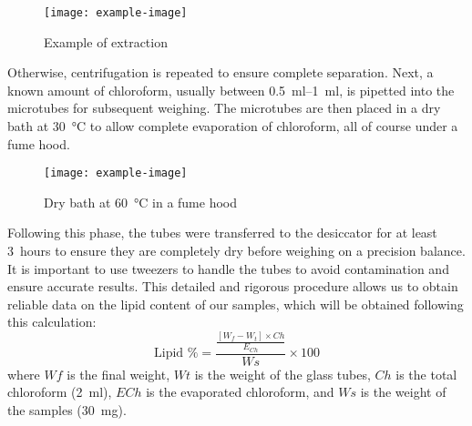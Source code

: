 \begin{figure}[H]
	\centering
	\texttt{[image: example-image]}
	\caption[]{Example of  extraction}
	\label{fig:}
\end{figure}

Otherwise, centrifugation is repeated to ensure complete separation. Next, a known amount of chloroform, usually between \qtyrange{0.5}{1}{\milli\litre}, is pipetted into the microtubes for subsequent weighing. The microtubes are then placed in a dry bath at \qty{30}{\degreeCelsius} to allow complete evaporation of chloroform, all of course under a fume hood.

\begin{figure}[H]
	\centering
	\texttt{[image: example-image]}
	\caption[]{Dry bath at \qty{60}{\degreeCelsius} in a fume hood}
	\label{fig:}
\end{figure}

Following this phase, the tubes were transferred to the desiccator for at least \qty{3}{hours} to ensure they are completely dry before weighing on a precision balance. It is important to use tweezers to handle the tubes to avoid contamination and ensure accurate results. This detailed and rigorous procedure allows us to obtain reliable data on the lipid content of our samples, which will be obtained following this calculation:\zariv{}
\[
	\text{Lipid \%}
	=
	\frac
		{\frac{[W_f - W_t] \times Ch}{E_{Ch}}}
		{Ws}
		\times 100
\]
where $ Wf $ is the final weight, $ Wt $ is the weight of the glass tubes, $ Ch $ is the total chloroform (\qty{2}{\milli\litre}), $ ECh $ is the evaporated chloroform, and $ Ws $ is the weight of the samples (\qty{30}{\milli\gram}).

